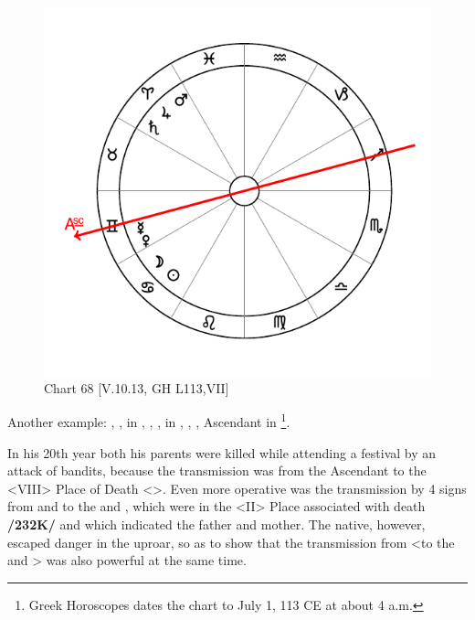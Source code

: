 \begin{figure}
\centering
\vspace{-20pt}
\includegraphics[width=.68\textwidth]{charts/5_10_13}
\caption{Chart 68 [V.10.13, GH L113,VII]}
\label{fig:chart68}
\end{figure}

\noindent Another example: \Sun, \Moon, in \Cancer, \Saturn, \Jupiter, \Mars\xspace in \Aries, \Venus, \Mercury, Ascendant in \Gemini\footnote{{Greek Horoscopes} dates the chart to July 1, 113 CE at about 4 a.m.}. 

In his 20th year both his parents were killed while attending a festival by an attack of bandits, because the transmission was from the Ascendant to the <VIII> Place of Death <\Capricorn>. Even more operative was the transmission by 4 signs from \Saturn\xspace and \Mars\xspace to the \Sun\xspace and \Moon, which were in the
<II> Place associated with death \textbf{/232K/} and which indicated the father and mother. The native, however, escaped danger in the uproar, so as to show that the transmission from \Jupiter\xspace <to the \Sun\xspace and \Moon> was also powerful at the same time.
\newpage